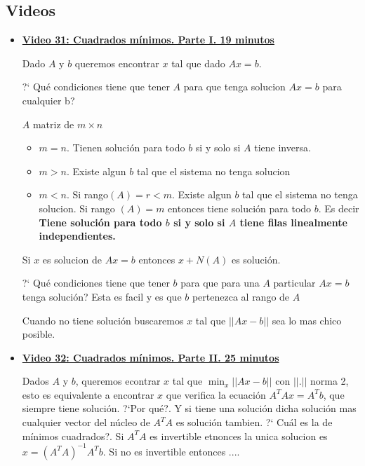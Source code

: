 \documentclass[12pt,a4paper]{article}
\newcommand\1{\mbox{\,\vrule height-0.8pt depth1.0pt width2pc\,}}
\newcommand\2{\mbox{\,\vrule height-0.8pt depth1.0pt width1pc\,}}
\begin{document}
\subsection*{Videos}

 \begin{itemize}

       
    \item      \href{https://youtu.be/B-P5a5-OpeI}{\bf Video 31: Cuadrados m\'inimos. Parte I. 19 minutos } 
       
       
      Dado $A $ y $b$  queremos encontrar $x$ tal que dado $Ax=b$.
      
      ?` Qu\'e condiciones tiene que tener $A$ para que tenga solucion $Ax=b$ para cualquier b?
      
      $A$ matriz de $m \times n$
      \begin{itemize}
          \item $m=n$. Tienen soluci\'on para todo $b$ si y solo si $A$ tiene inversa.
          
          \item $m>n$.  Existe algun $b$ tal que el sistema no tenga solucion
          
          \item $m<n$. Si rango$(A) = r < m $.  Existe algun $b$ tal que el sistema no tenga solucion.
        Si rango $(A)=m$ entonces tiene soluci\'on para todo $b$. Es decir  
       {\bf   Tiene soluci\'on para todo $b$ si y solo si $A$ tiene filas linealmente independientes.}
         
         
       
      \end{itemize}
      Si $x$ es solucion de $Ax=b$ entonces $x+ N(A)$ es soluci\'on. 
      
      ?` Qu\'e condiciones tiene que tener $b$ para que para una $A$ particular $Ax=b$ tenga soluci\'on? Esta es facil y es que $b $ pertenezca al rango de $A$
      
      
      Cuando no tiene soluci\'on buscaremos $x$ tal que $||Ax - b||$ sea lo mas chico posible.
      
       \item      \href{https://youtu.be/cE-x_KfMoqU}{\bf Video 32: Cuadrados m\'inimos. Parte II. 25 minutos } 
    
    Dados $A$ y $b$, queremos econtrar $x$ tal que $\min_x ||Ax - b||$ con $||.||$ norma 2, esto es equivalente a encontrar $x$ que verifica la ecuaci\'on $A^T A x= A^T b$, que siempre tiene soluci\'on. ?`Por qu\'e?. Y si tiene una soluci\'on dicha soluci\'on mas cualquier vector del n\'ucleo de $A^T A$ es soluci\'on tambien. ?` Cu\'al es la de m\'inimos cuadrados?. Si $A^T A$ es invertible etnonces la unica solucion es $x=(A^T A)^{-1} A^T b$. Si no es invertible entonces ....
    

\end{itemize}
\end{document}

